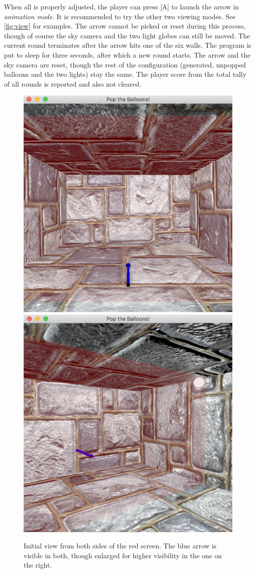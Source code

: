 \documentclass{article}[12pt]
\begin{document}
When all is properly adjusted, the player can press [A] to launch the arrow in \emph{animation mode}. It is recommended to try the other two viewing modes. See \cref{fig:view} for examples. The arrow cannot be picked or reset during this process, though of course the sky camera and the two light globes can still be moved. The current round terminates after the arrow hits one of the six walls. The program is put to sleep for three seconds, after which a new round starts. The arrow and the sky camera are reset, though the rest of the configuration (generated, unpopped balloons and the two lights) stay the same. The player score from the total tally of all rounds is reported and also not cleared. 
\begin{figure}[b]
    \centering
    \includegraphics[width=.47\textwidth]{init-a.png}
    \includegraphics[width=.47\textwidth]{init-b.png}
    \caption{Initial view from both sides of the red screen. The blue arrow is visible in both, though enlarged for higher visibility in the one on the right. 
    \label{fig:init}}
\end{figure}
\end{document}
